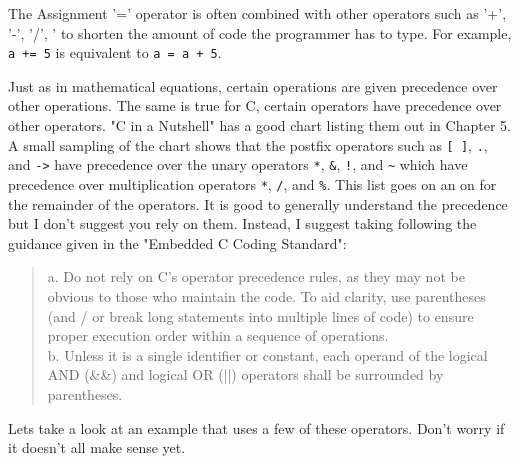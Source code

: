 \documentclass[../main.tex]{subfiles}
\begin{document}
	The Assignment '=' operator is often combined with other operators such as '+', '-', '/', ' to shorten the amount of code the programmer has to type.  For example, \texttt{a += 5} is equivalent to \texttt{a = a + 5}.
	
	Just as in mathematical equations, certain operations are given precedence over other operations.  The same is true for C, certain operators have precedence over other operators. "C in a Nutshell"\cite{c_nutshell} has a good chart listing them out in Chapter 5.  A small sampling of the chart shows that the postfix operators such as \texttt{[ ]}, \texttt{.}, and \texttt{->} have precedence over the unary operators \texttt{*}, \texttt{\&}, \texttt{!}, and \texttt{\textasciitilde} which have precedence over multiplication operators \texttt{*}, \texttt{/}, and \texttt{\%}.  This list goes on an on for the remainder of the operators.  It is good to generally understand the precedence but I don't suggest you rely on them.  Instead, I suggest taking following the guidance given in the "Embedded C Coding Standard"\cite{embedded_c}:

	\begin{quotation}
		a.	Do not rely on C's operator precedence rules, as they may not be obvious to those who maintain the code.  To aid clarity, use parentheses (and / or break long statements into multiple lines of code) to ensure proper execution order within a sequence of operations.\\
		b.	Unless it is a single identifier or constant, each operand of the logical AND (\&\&) and logical OR (||) operators shall be surrounded by parentheses.
	\end{quotation}
	
	Lets take a look at an example that uses a few of these operators.  Don't worry if it doesn't all make sense yet.\\
	
	
	
\end{document}
